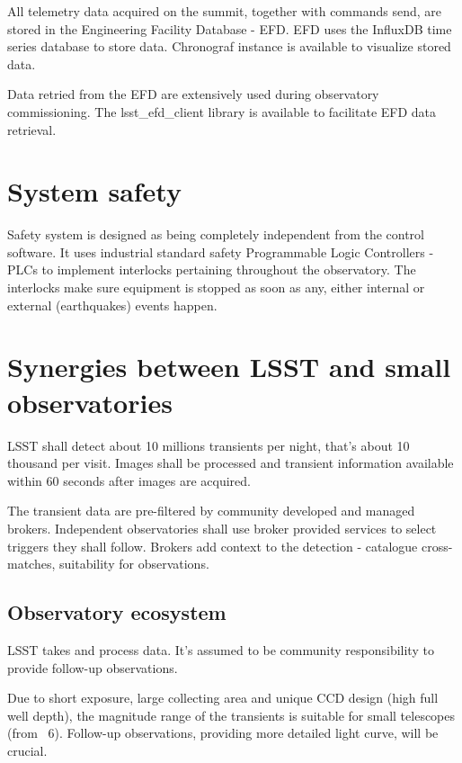 \documentclass[proceedings, preprint]{rmaa}
\begin{document}
All telemetry data acquired on the summit, together with commands send, are
stored in the Engineering Facility Database - EFD. EFD uses the InfluxDB time
series database to store data. Chronograf instance is available to visualize
stored data.

Data retried from the EFD are extensively used during observatory
commissioning. The lsst\_efd\_client library is available to facilitate EFD data
retrieval\cite{lsst_efd}.

\section{System safety}

Safety system is designed as being completely independent from the control
software. It uses industrial standard safety Programmable Logic Controllers -
PLCs to implement interlocks pertaining throughout the observatory. The
interlocks make sure equipment is stopped as soon as any, either internal or
external (earthquakes) events happen.

\section{Synergies between LSST and small observatories}

LSST shall detect about 10 millions transients per night, that's about 10
thousand per visit\cite{lsstdata}. Images shall be processed and transient
information available within 60 seconds after images are acquired.

The transient data are pre-filtered by community developed and managed
brokers\cite{databrokers}. Independent observatories shall use broker provided
services to select triggers they shall follow. Brokers add context to the
detection - catalogue cross-matches, suitability for observations.

\subsection{Observatory ecosystem}

LSST takes and process data. It's assumed to be community responsibility to
provide follow-up observations.

Due to short exposure, large collecting area and unique CCD design (high full
well depth), the magnitude range of the transients is suitable for small
telescopes (from ~6). Follow-up observations, providing more detailed light
curve, will be crucial.
\end{document}
